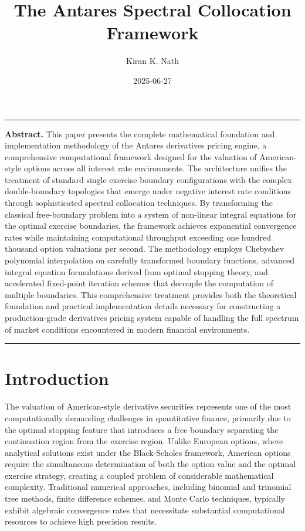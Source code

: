 \documentclass[
  american,
  11pt,
  11pt,
  letterpaper,
  onecolumn]{article}
\title{The Antares Spectral Collocation Framework}
\author{Kiran K. Nath}
\date{2025-06-27}
\renewenvironment{abstract}
  {\small\quotation\noindent\rule{\linewidth}{.5pt}\par\smallskip
   \noindent\textbf{Abstract.}\space}
  {\par\smallskip\noindent\rule{\linewidth}{.5pt}\endquotation}
\begin{document}
\maketitle
\begin{abstract}
This paper presents the complete mathematical foundation and
implementation methodology of the Antares derivatives pricing engine, a
comprehensive computational framework designed for the valuation of
American-style options across all interest rate environments. The
architecture unifies the treatment of standard single exercise boundary
configurations with the complex double-boundary topologies that emerge
under negative interest rate conditions through sophisticated spectral
collocation techniques. By transforming the classical free-boundary
problem into a system of non-linear integral equations for the optimal
exercise boundaries, the framework achieves exponential convergence
rates while maintaining computational throughput exceeding one hundred
thousand option valuations per second. The methodology employs Chebyshev
polynomial interpolation on carefully transformed boundary functions,
advanced integral equation formulations derived from optimal stopping
theory, and accelerated fixed-point iteration schemes that decouple the
computation of multiple boundaries. This comprehensive treatment
provides both the theoretical foundation and practical implementation
details necessary for constructing a production-grade derivatives
pricing system capable of handling the full spectrum of market
conditions encountered in modern financial environments.
\end{abstract}


\section{Introduction}\label{introduction}

The valuation of American-style derivative securities represents one of
the most computationally demanding challenges in quantitative finance,
primarily due to the optimal stopping feature that introduces a free
boundary separating the continuation region from the exercise region.
Unlike European options, where analytical solutions exist under the
Black-Scholes framework, American options require the simultaneous
determination of both the option value and the optimal exercise
strategy, creating a coupled problem of considerable mathematical
complexity. Traditional numerical approaches, including binomial and
trinomial tree methods, finite difference schemes, and Monte Carlo
techniques, typically exhibit algebraic convergence rates that
necessitate substantial computational resources to achieve high
precision results.
\end{document}
